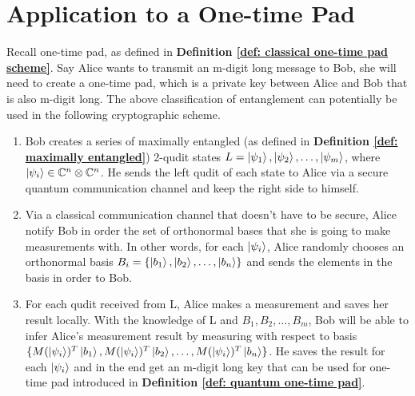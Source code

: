 \section{Application to a One-time Pad}
Recall one-time pad, as defined in \textbf{Definition \ref{def: classical one-time pad scheme}}. Say Alice wants to transmit an m-digit long message to Bob, she will need to create a one-time pad, which is a private key between Alice and Bob that is also m-digit long. The above classification of entanglement can potentially be used in the following cryptographic scheme.
\begin{enumerate}
    \item Bob creates a series of maximally entangled (as defined in \textbf{Definition \ref{def: maximally entangled}}) 2-qudit states $L={\ket{\psi_1}, \ket{\psi_2}, \hdots, \ket{\psi_m}}$, where $\ket{\psi_i} \in \mathbb{C}^n \otimes \mathbb{C}^n$. He sends the left qudit of each state to Alice via a secure quantum communication channel and keep the right side to himself.
    \item Via a classical communication channel that doesn't have to be secure, Alice notify Bob in order the set of orthonormal bases that she is going to make measurements with. In other words, for each $\ket{\psi_i}$, Alice randomly chooses an orthonormal basis $B_i=\{\ket{b_1}, \ket{b_2}, \hdots, \ket{b_n}\}$ and sends the elements in the basis in order to Bob.
    \item For each qudit received from L, Alice makes a measurement and saves her result locally. With the knowledge of L and $B_1, B_2, \hdots, B_m$, Bob will be able to infer Alice's measurement result by measuring with respect to basis $\{M(\ket{\psi_i})^T \ket{b_1}, M(\ket{\psi_i})^T \ket{b_2}, \hdots, M(\ket{\psi_i})^T \ket{b_n}\}$. He saves the result for each $\ket{\psi_i}$ and in the end get an m-digit long key that can be used for one-time pad introduced in \textbf{Definition \ref{def: quantum one-time pad}}.
\end{enumerate}